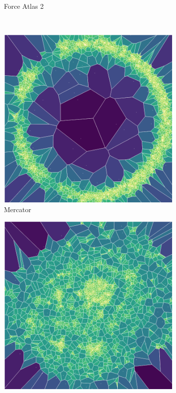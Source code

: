 \begin{figure}[H]
\begin{subfigure}[b]{.49\textwidth}
         \caption{Force Atlas 2}
         \label{fig:afa}
     \end{subfigure}\\
         \begin{subfigure}[b]{.49\textwidth}
         \centering \includegraphics[width=\textwidth,angle=0]{figures_c1/area/fill_mercloc.png}
         \caption{Mercator}
         \label{fig:amer}
     \end{subfigure}
     \begin{subfigure}[b]{.49\textwidth}
         \centering \includegraphics[width=\textwidth,angle=-90]{figures_c1/area/fill_tsnetloc.png}

\end{subfigure}
\end{figure}
